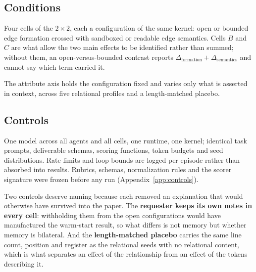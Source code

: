 \subsection{Conditions}

Four cells of the $2\times2$, each a configuration of the same kernel: open or bounded
edge formation crossed with sandboxed or readable edge semantics. Cells $B$ and $C$ are
what allow the two main effects to be identified rather than summed; without them, an
open-versus-bounded contrast reports $\Delta_\text{formation} + \Delta_\text{semantics}$
and cannot say which term carried it.

The attribute axis holds the configuration fixed and varies only what is asserted in
context, across five relational profiles and a length-matched placebo.

\subsection{Controls}

One model across all agents and all cells, one runtime, one kernel; identical task
prompts, deliverable schemas, scoring functions, token budgets and seed distributions.
Rate limits and loop bounds are logged per episode rather than absorbed into results.
Rubrics, schemas, normalization rules and the scorer signature were frozen before any
run (Appendix~\ref{app:controls}).

Two controls deserve naming because each removed an explanation that would otherwise
have survived into the paper. The \textbf{requester keeps its own notes in every
cell}: withholding them from the open configurations would have manufactured the
warm-start result, so what differs is not memory but whether memory is bilateral. And
the \textbf{length-matched placebo} carries the same line count, position and register
as the relational seeds with no relational content, which is what separates an effect
of the relationship from an effect of the tokens describing it.
